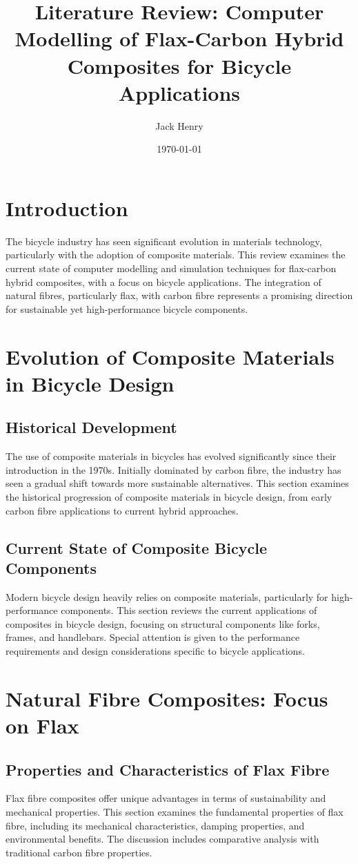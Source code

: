 \documentclass[11pt,twocolumn]{article}
\title{Literature Review: Computer Modelling of Flax-Carbon Hybrid Composites for Bicycle Applications}
\author{Jack Henry}
\date{\today}
\begin{document}
\maketitle

\section{Introduction}
The bicycle industry has seen significant evolution in materials technology, particularly with the adoption of composite materials. This review examines the current state of computer modelling and simulation techniques for flax-carbon hybrid composites, with a focus on bicycle applications. The integration of natural fibres, particularly flax, with carbon fibre represents a promising direction for sustainable yet high-performance bicycle components.

\section{Evolution of Composite Materials in Bicycle Design}
\subsection{Historical Development}
The use of composite materials in bicycles has evolved significantly since their introduction in the 1970s. Initially dominated by carbon fibre, the industry has seen a gradual shift towards more sustainable alternatives. This section examines the historical progression of composite materials in bicycle design, from early carbon fibre applications to current hybrid approaches.

\subsection{Current State of Composite Bicycle Components}
Modern bicycle design heavily relies on composite materials, particularly for high-performance components. This section reviews the current applications of composites in bicycle design, focusing on structural components like forks, frames, and handlebars. Special attention is given to the performance requirements and design considerations specific to bicycle applications.

\section{Natural Fibre Composites: Focus on Flax}
\subsection{Properties and Characteristics of Flax Fibre}
Flax fibre composites offer unique advantages in terms of sustainability and mechanical properties. This section examines the fundamental properties of flax fibre, including its mechanical characteristics, damping properties, and environmental benefits. The discussion includes comparative analysis with traditional carbon fibre properties.
\end{document}
